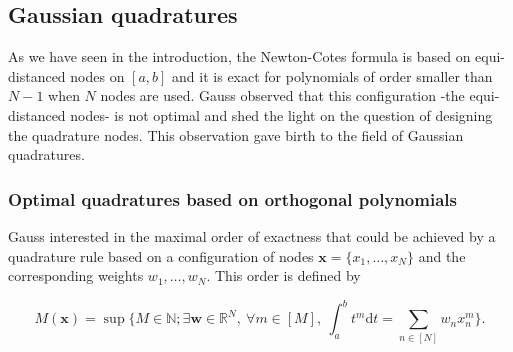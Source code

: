 \documentclass[twoside,11pt]{book}
\numberwithin{theorem}{chapter}
\numberwithin{definition}{chapter}
\numberwithin{proposition}{chapter}
\numberwithin{corollary}{chapter}
\numberwithin{example}{chapter}
\numberwithin{lemma}{chapter}
\begin{document}




\subsection{Gaussian quadratures}
As we have seen in the introduction, the Newton-Cotes formula is based on equi-distanced nodes on $[a,b]$ and it is exact for polynomials of order smaller than $N-1$ when $N$ nodes are used. Gauss observed that this configuration -the equi-distanced nodes- is not optimal and shed the light on the question of designing the quadrature nodes. This observation gave birth to the field of Gaussian quadratures.

\subsubsection{Optimal quadratures based on  orthogonal polynomials}

 Gauss interested in the maximal order of exactness that could be achieved by a quadrature rule based on a configuration of nodes $\bm{x} = \{ x_{1}, \dots, x_{N} \}$ and the corresponding weights $w_{1}, \dots, w_{N}$. This order is defined by 

\begin{equation}
M(\bm{x}) = \sup \{ M \in \mathbb{N}; \exists \bm{w} \in \mathbb{R}^{N}, \: \forall m \in [M], \: \int_{a}^{b} t^{m} \mathrm{d}t = \sum\limits_{n \in [N]} w_{n}x_{n}^{m} \}.
\end{equation}




\end{document}
